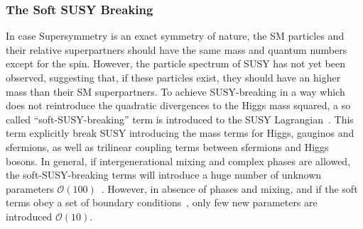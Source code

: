 \subsubsection{The Soft SUSY Breaking}
In case  Supersymmetry is an exact symmetry of nature, the SM particles and their relative superpartners should have the same mass 
and quantum numbers except for the spin. However, the particle spectrum of SUSY has not yet been observed, suggesting that,
if  these particles exist, they  should have an higher mass than their SM superpartners. 
To achieve SUSY-breaking in a way which does not reintroduce the quadratic divergences to the Higgs mass squared, a so called ``soft-SUSY-breaking''
term is introduced to the SUSY Lagrangian~\cite{softerm1,softerm2}. This term explicitly break SUSY introducing the mass terms for Higgs, gauginos and
sfermions, as well as  trilinear coupling terms between sfermions and Higgs bosons. In general, if intergenerational mixing and 
complex phases are allowed, the soft-SUSY-breaking terms will introduce a huge number of unknown parameters $\mathcal{O}(100)$~\cite{softerm3}.
However, in absence of phases and  mixing, and if the soft terms obey  a set of boundary conditions~\cite{softerm1,softerm2}, 
only few new parameters are introduced $\mathcal{O}(10)$.




